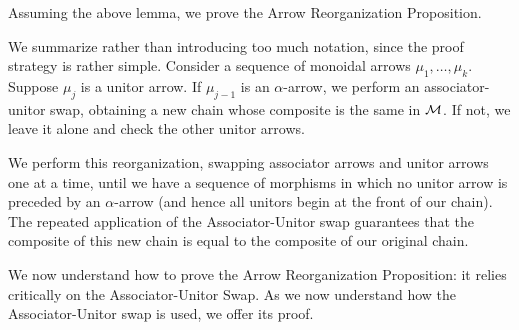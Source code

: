Assuming the above lemma, we prove the Arrow Reorganization Proposition. 
\begin{varprf}
    We summarize rather than introducing too much notation, since the proof strategy 
    is rather simple.
    Consider a sequence of monoidal arrows 
    $\mu_1, \dots, \mu_k$. Suppose $\mu_{j}$ is a unitor arrow. If $\mu_{j-1}$ 
    is an $\alpha$-arrow, we perform an associator-unitor swap, obtaining a new chain 
    whose composite is the same in $\mathcal{M}$. If not, we leave it alone 
    and check the other unitor arrows. 

    We perform this reorganization, swapping associator arrows and unitor arrows one at a time, 
    until we have a sequence of morphisms in which no unitor arrow is preceded by 
    an $\alpha$-arrow (and hence all unitors begin at the front of our chain).
    The repeated application of the Associator-Unitor swap guarantees that
    the composite of this new chain is equal to the composite of our original chain.
\end{varprf}

We now understand how to prove the Arrow Reorganization Proposition: it 
relies critically on the Associator-Unitor Swap. As we now understand how the 
Associator-Unitor swap is used, we offer its proof.

